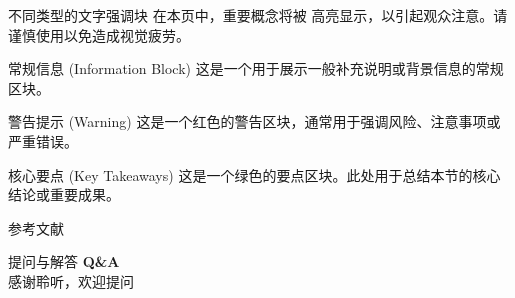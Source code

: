 \documentclass[aspectratio=169]{beamer}
\begin{document}
\begin{frame}{不同类型的文字强调块}
在本页中，重要概念将被 \alert{高亮显示}，以引起观众注意。请谨慎使用以免造成视觉疲劳。

\vspace{0.5em}
\begin{block}{常规信息 (Information Block)}
这是一个用于展示一般补充说明或背景信息的常规区块。
\end{block}

\vspace{0.5em}
\begin{alertblock}{警告提示 (Warning)}
这是一个红色的警告区块，通常用于强调风险、注意事项或严重错误。
\end{alertblock}

\vspace{0.5em}
\begin{exampleblock}{核心要点 (Key Takeaways)}
这是一个绿色的要点区块。此处用于总结本节的核心结论或重要成果。
\end{exampleblock}

\end{frame}


\begin{frame}{参考文献}
\nocite{*}
  \footnotesize
  
  
  
\end{frame}

\begin{frame}{提问与解答}
  \centering
  \vspace{0.8cm}
  {\Huge {\bfseries Q\&A} \\
  \vspace{0.25em} \Large 感谢聆听，欢迎提问}
\end{frame}

\begin{frame}[plain]
\end{frame}
\end{document}
